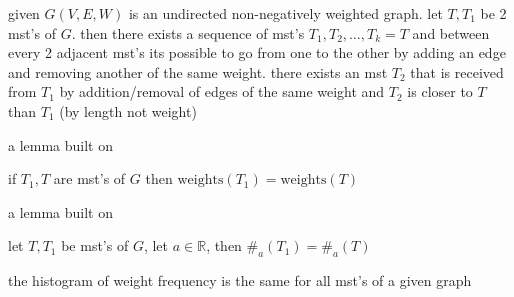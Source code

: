 \documentclass[a4paper,12pt]{article}
\begin{document}
\begin{lemma}
given \(G(V,E,W)\) is an undirected non-negatively weighted graph. let \(T,T_1\) be 2 mst's of \(G\). then there exists a sequence of mst's \(T_1,T_2,\dots,T_k=T\) and between every 2 adjacent mst's its possible to go from one to the other by adding an edge and removing another of the same weight. there exists an mst \(T_2\) that is received from \(T_1\) by addition/removal of edges of the same weight and \(T_2\) is closer to \(T\) than \(T_1\) (by length not weight)\\
\end{lemma}
\begin{lemma}
\begin{note}
a lemma built on \\
\end{note}
if \(T_1,T\) are mst's of \(G\) then \(\mathrm{weights}(T_1)=\mathrm{weights}(T)\)\\
\end{lemma}
\begin{lemma}
\begin{note}
a lemma built on \\
\end{note}
let \(T,T_1\) be mst's of \(G\), let \(a \in \mathbb{R}\), then \(\#_a(T_1)=\#_a(T)\)\\
\begin{entailment}
the histogram of weight frequency is the same for all mst's of a given graph\\
\end{entailment}
\end{lemma}
\end{document}
